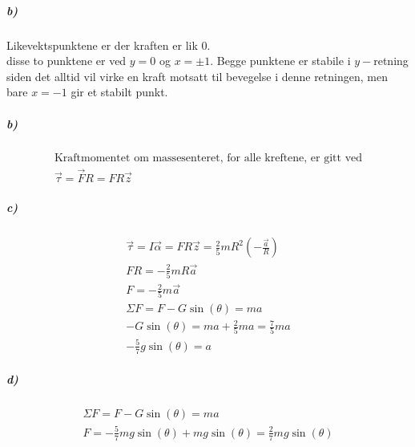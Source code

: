 \documentclass[11pt, A4paper,norsk]{article}
\begin{document}
			\subparagraph{b)}
				\begin{flushleft}
Likevektspunktene er der kraften er lik $0$. \\
disse to punktene er ved $y = 0$ og $x = \pm 1$. Begge punktene er stabile i $y-$retning siden det alltid vil virke en kraft motsatt til bevegelse i denne retningen, men bare $x = - 1$ gir et stabilt punkt.
				\end{flushleft}









			\subparagraph{b)}
				\begin{gather*}
\text{Kraftmomentet om massesenteret, for alle kreftene, er gitt ved} \\
\vec{\tau} = \vec{F}R = F R \vec{z}
				\end{gather*}









			\subparagraph{c)}
				\begin{gather*}
\vec{\tau} = I \vec{\alpha} = FR \vec{z} = \frac{2}{5} m R^2 \left( - \frac{\vec{a}}{R} \right) \\
FR = - \frac{2}{5} m R \vec{a} \\
F = - \frac{2}{5} m \vec{a} \\
\Sigma F = F - G \sin(\theta) = ma \\
- G \sin(\theta) = ma + \frac{2}{5} ma = \frac{7}{5} ma \\
- \frac{5}{7} g \sin(\theta) = a
				\end{gather*}









			\subparagraph{d)}
				\begin{gather*}
\Sigma F = F - G \sin(\theta) = ma \\
F = - \frac{5}{7} mg \sin(\theta) + mg \sin(\theta) = \frac{2}{7} mg \sin(\theta)
				\end{gather*}
\end{document}
